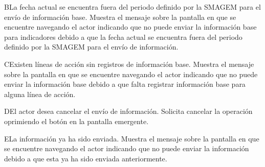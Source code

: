   \begin{UCtrayectoriaA}{B}{La fecha actual se encuentra fuera del periodo definido por la SMAGEM para el envío de información base.}
    \UCpaso[\UCsist] Muestra el mensaje  sobre la pantalla en que se encuentre navegando el actor indicando que no puede enviar la información base para indicadores debido a que la fecha actual se encuentra fuera del periodo definido por la SMAGEM para el envío de información. 
 \end{UCtrayectoriaA}
 
  \begin{UCtrayectoriaA}{C}{Existen líneas de acción sin registros de información base.}
    \UCpaso[\UCsist] Muestra el mensaje  sobre la pantalla en que se encuentre navegando el actor indicando que no puede enviar la información base debido a que falta registrar información base para alguna línea de acción. 
 \end{UCtrayectoriaA}
 
     \begin{UCtrayectoriaA}{D}{El actor desea cancelar el envío de información.}
    \UCpaso[\UCactor] Solicita cancelar la operación oprimiendo el botón  en la pantalla emergente.
    \end{UCtrayectoriaA}
    
     \begin{UCtrayectoriaA}{E}{La información ya ha sido enviada.}
    \UCpaso[\UCsist] Muestra el mensaje  sobre la pantalla en que se encuentre navegando el actor indicando que no puede enviar la información debido a que esta ya ha sido enviada anteriormente. 
    \end{UCtrayectoriaA}

